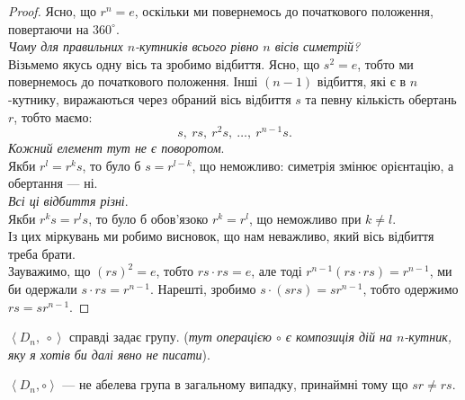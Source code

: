 \documentclass{math_library}
\begin{document}
\begin{proof}
Ясно, що $r^n = e$, оскільки ми повернемось до початкового положення, повертаючи на $360^\circ$.
\bigskip \\
\textit{Чому для правильних $n$-кутників всього рівно $n$ вісів симетрій?}\\
Візьмемо якусь одну вісь та зробимо відбиття. Ясно, що $s^2 = e$, тобто ми повернемось до початкового положення. Інші $(n-1)$ відбиття, які є в $n$-кутнику, виражаються через обраний вісь відбиття $s$ та певну кількість обертань $r$, тобто маємо:
\[
s,\ rs,\ r^2s,\ \dots,\ r^{n-1}s.
\]
\textit{Кожний елемент тут не є поворотом}.\\
Якби $r^l = r^ks$, то було б $s = r^{l-k}$, що неможливо: симетрія змінює орієнтацію, а обертання --- ні.
\bigskip \\
\textit{Всі ці відбиття різні}.\\
Якби $r^k s = r^l s$, то було б обов'язоко $r^k = r^l$, що неможливо при $k \neq l$.
\bigskip \\
Із цих міркувань ми робимо висновок, що нам неважливо, який вісь відбиття треба брати.
\bigskip \\
Зауважимо, що $(rs)^2 = e$, тобто $rs \cdot rs = e$, але тоді $r^{n-1} (rs \cdot rs) = r^{n-1}$, ми би одержали $s \cdot rs = r^{n-1}$. Нарешті, зробимо $s \cdot (srs) = sr^{n-1}$, тобто одержимо $rs = sr^{n-1}$.
\end{proof}

\begin{theorem}
$\left< D_n,\ \circ \right>$ справді задає групу. (\textit{тут операцією $\circ$ є композиція дій на $n$-кутник, яку я хотів би далі явно не писати}).
\end{theorem}

\begin{remark}
$\left< D_n, \circ \right>$ --- не абелева група в загальному випадку, принаймні тому що $sr \neq rs$.
\end{remark}
\end{document}
